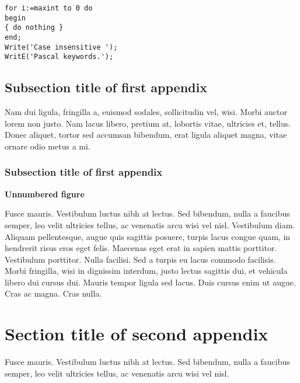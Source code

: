 \documentclass[AMA,STIX2COL,Linenumberson]{MRM}
\begin{document}
\begin{lstlisting}[caption={Descriptive Caption Text},label=DescriptiveLabel]
for i:=maxint to 0 do
begin
{ do nothing }
end;
Write('Case insensitive ');
WritE('Pascal keywords.');
\end{lstlisting}



\subsection{Subsection title of first appendix\label{app1.1a}}

Nam dui ligula, fringilla a, euismod sodales, sollicitudin vel, wisi. Morbi auctor lorem non justo. Nam lacus libero, pretium at, lobortis vitae, ultricies et, tellus. Donec aliquet, tortor sed accumsan bibendum, erat ligula aliquet magna, vitae ornare odio metus a mi.

\subsubsection{Subsection title of first appendix\label{app1.1.1a}}

\noindent\textbf{Unnumbered figure}



Fusce mauris. Vestibulum luctus nibh at lectus. Sed bibendum, nulla a faucibus semper, leo velit ultricies tellus, ac
venenatis arcu wisi vel nisl. Vestibulum diam. Aliquam pellentesque, augue quis sagittis posuere, turpis lacus congue
quam, in hendrerit risus eros eget felis. Maecenas eget erat in sapien mattis porttitor. Vestibulum porttitor. Nulla
facilisi. Sed a turpis eu lacus commodo facilisis. Morbi fringilla, wisi in dignissim interdum, justo lectus sagittis dui, et
vehicula libero dui cursus dui. Mauris tempor ligula sed lacus. Duis cursus enim ut augue. Cras ac magna. Cras nulla.

\section{Section title of second appendix\label{app2}}%

Fusce mauris. Vestibulum luctus nibh at lectus. Sed bibendum, nulla a faucibus semper, leo velit ultricies tellus, ac venenatis arcu wisi vel nisl.


\end{document}
